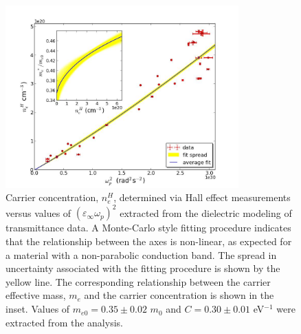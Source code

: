 \documentclass[preprint]{elsarticle}
\begin{document}
\begin{figure}[p]
\centering
\includegraphics[width = 0.8\textwidth]{figure1c}
\caption{\label{fig:3} Carrier concentration, $n_e^H$, determined via Hall effect measurements versus values of $(\varepsilon_{\infty}\omega_p)^2$ extracted from the dielectric modeling of transmittance data. A Monte-Carlo style fitting procedure \cite{Mendelsberg2009, Anders2012} indicates that the relationship between the axes is non-linear, as expected for a material with a non-parabolic conduction band. The spread in uncertainty associated with the fitting procedure is shown by the yellow line. The corresponding relationship between the carrier effective mass, $m_e$ and the carrier concentration is shown in the inset. Values of $m_{e0}=0.35 \pm 0.02$ $m_{0}$ and $C = 0.30 \pm 0.01$ eV$^{-1}$ were extracted from the analysis.}
\end{figure}
\end{document}
